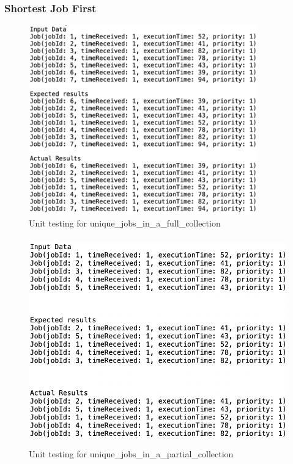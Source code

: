 \documentclass[a4paper]{article}
\begin{document}
\subsubsection{Shortest Job First}
\begin{figure}[H]
   \includegraphics[height=8.2cm]{images/SJF-unique_jobs_in_a_full_collection.png}
   \caption{Unit testing for unique\_jobs\_in\_a\_full\_collection}
\end{figure}

\begin{figure}[H]
   \includegraphics[height=9cm]{images/SJF-unique_jobs_in_a_partial_collection.png}
   \caption{Unit testing for unique\_jobs\_in\_a\_partial\_collection}
\end{figure}
\end{document}
